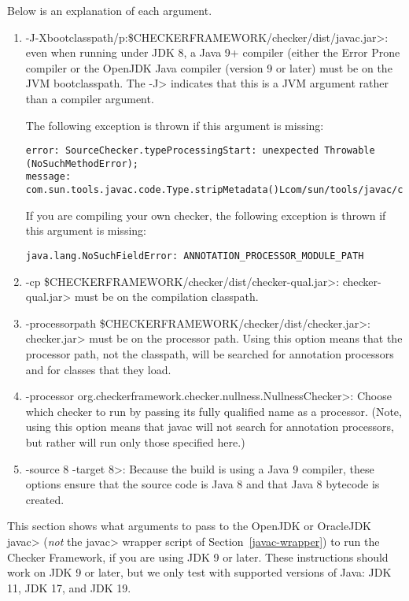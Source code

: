 Below is an explanation of each argument.
\begin{enumerate}
\item \<-J-Xbootclasspath/p:\$CHECKERFRAMEWORK/checker/dist/javac.jar>:
even when running under JDK 8, a Java 9+ compiler (either the Error Prone
compiler or the OpenJDK Java compiler (version 9 or later) must be on the JVM bootclasspath.
The \<-J> indicates that this is a JVM argument rather than a compiler
argument.

The following exception is thrown if this argument is missing:
\begin{Verbatim}
error: SourceChecker.typeProcessingStart: unexpected Throwable (NoSuchMethodError);
message: com.sun.tools.javac.code.Type.stripMetadata()Lcom/sun/tools/javac/code/Type;
\end{Verbatim}

If you are compiling your own checker, the following exception is thrown if this argument is missing:
\begin{Verbatim}
java.lang.NoSuchFieldError: ANNOTATION_PROCESSOR_MODULE_PATH
\end{Verbatim}

\item \<-cp \$CHECKERFRAMEWORK/checker/dist/checker-qual.jar>: \<checker-qual.jar>
must be on the compilation classpath.

\item \<-processorpath \$CHECKERFRAMEWORK/checker/dist/checker.jar>:
\<checker.jar> must be on the processor path. Using this option means that the processor path, not
the classpath, will be searched for annotation processors
and for classes that they load.

\item \<-processor org.checkerframework.checker.nullness.NullnessChecker>:
Choose which checker to run by passing its fully qualified name as a processor.
(Note, using this option means that javac will not search for annotation
processors, but rather will run only those specified here.)

\item \<-source 8 -target 8>: Because the build is using
a Java 9 compiler, these options ensure that the
source code is Java 8 and that Java 8 bytecode is created.

\end{enumerate}



This section shows what arguments to pass to the OpenJDK or OracleJDK
\<javac> (\emph{not} the \<javac> wrapper script of
Section~\ref{javac-wrapper}) to run the Checker
Framework, if you are using JDK 9 or later.  These
instructions should work on JDK 9 or later, but we only test with supported
versions of Java: JDK 11, JDK 17, and JDK 19.


